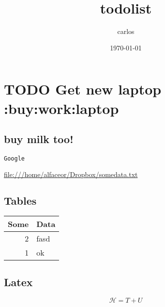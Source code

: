 \documentclass[11pt]{article}
\author{carlos}
\date{\today}
\title{todolist}
\begin{document}
\maketitle
\tableofcontents

\section{{\bfseries\sffamily TODO} Get new laptop :buy:work:laptop}
\label{sec-1}
\subsection{buy milk too!}
\label{sec-1-1}
\texttt{Google}

\url{file:///home/alfaceor/Dropbox/somedata.txt}

\subsection{Tables}
\label{sec-1-2}
\begin{center}
\begin{tabular}{rl}
Some & Data\\
\hline
2 & fasd\\
1 & ok\\
\end{tabular}
\end{center}

\subsection{Latex}
\label{sec-1-3}
\begin{equation}
 \mathcal{H} =  T+ U
\end{equation}
\end{document}
